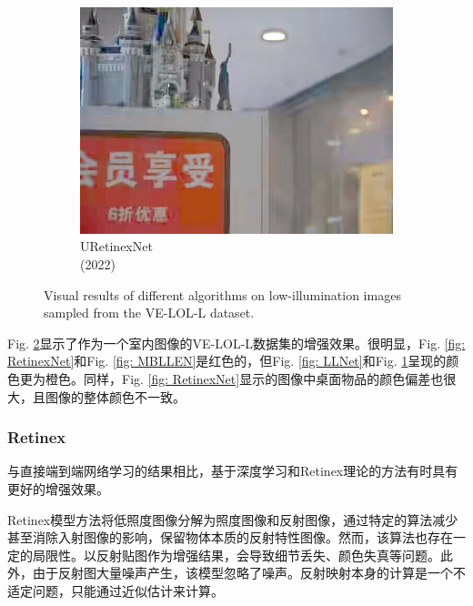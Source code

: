 \documentclass[letterpaper,12pt]{article}
\begin{document}
\begin{figure}[htbp]
\begin{subfigure}{0.19\textwidth}
					\includegraphics[width=\linewidth]{VE-LOL-L/URetinexNet}
					\captionsetup{font=scriptsize}
					\caption{URetinexNet \\ (2022)}
					\label{fig: URetinexNet}	
				\end{subfigure}
				\captionsetup{font=scriptsize}
				\caption{
					\label{fig: VE-LOL-L Visual} %
						Visual results of different algorithms on low-illumination images sampled from the VE-LOL-L dataset.
				}
			\end{figure}
			
			Fig. \ref{fig: VE-LOL-L Visual}显示了作为一个室内图像的VE-LOL-L数据集的增强效果。很明显，Fig. \ref{fig: RetinexNet}和Fig. \ref{fig: MBLLEN}是红色的，但Fig. \ref{fig: LLNet}和Fig. \ref{fig: URetinexNet}呈现的颜色更为橙色。同样，Fig. \ref{fig: RetinexNet}显示的图像中桌面物品的颜色偏差也很大，且图像的整体颜色不一致。
			
			\subsubsection{Retinex}
	
			与直接端到端网络学习的结果相比，基于深度学习和Retinex理论的方法有时具有更好的增强效果。
			
			Retinex模型方法将低照度图像分解为照度图像和反射图像，通过特定的算法减少甚至消除入射图像的影响，保留物体本质的反射特性图像。然而，该算法也存在一定的局限性。以反射贴图作为增强结果，会导致细节丢失、颜色失真等问题。此外，由于反射图大量噪声产生，该模型忽略了噪声。反射映射本身的计算是一个不适定问题，只能通过近似估计来计算。
			
\end{document}
